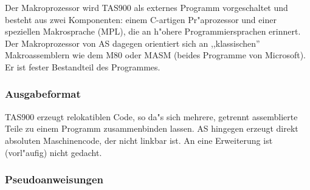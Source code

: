 \documentclass[12pt,a4paper,twoside]{report}
\begin{document}
Der Makroprozessor wird TAS900 als externes Programm vorgeschaltet und
besteht aus zwei Komponenten: einem C-artigen Pr"aprozessor und einer
speziellen Makrosprache (MPL), die an h"ohere Programmiersprachen
erinnert.  Der Makroprozessor von AS dagegen orientiert sich an
,,klassischen'' Makroassemblern wie dem M80 oder MASM (beides Programme
von Microsoft).  Er ist fester Bestandteil des Programmes.

\subsubsection{Ausgabeformat}

TAS900 erzeugt relokatiblen Code, so da"s sich mehrere, getrennt assemblierte
Teile zu einem Programm zusammenbinden lassen.  AS hingegen erzeugt direkt
absoluten Maschinencode, der nicht linkbar ist.  An eine Erweiterung ist
(vorl"aufig) nicht gedacht.

\subsubsection{Pseudoanweisungen}
\end{document}
